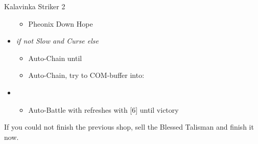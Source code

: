 \begin{battle}[1:28]{Kalavinka Striker 2}
\begin{itemize}
\begin{itemize}
				      \item Pheonix Down Hope
			      \end{itemize}
			\item \second \textit{ if not Slow and Curse else} \fourth
			      \begin{itemize}
				      \item Auto-Chain until \stagger
				      \item Auto-Chain, try to COM-buffer into:
			      \end{itemize}
			\item \fifth
			      \begin{itemize}
				      \item Auto-Battle with refreshes with [6] until victory
			      \end{itemize}
		\end{itemize}
	\end{battle}
	If you could not finish the previous shop, sell the Blessed Talisman and finish it now.
	\vfill
	
